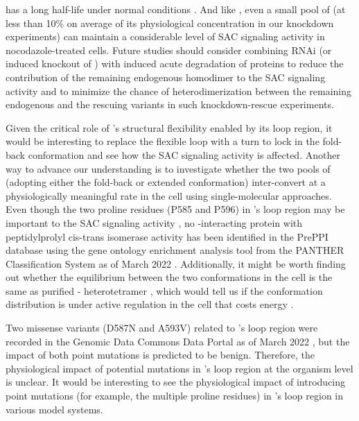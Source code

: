  has a long half-life under normal conditions \cite{MAD1MAD2Half-life}. And like  \cite{Raaijmakers2018, RZZ-MAD1vsBUB1-MAD1_2018, siROD_Zhang2019}, even a small pool of  (at less than 10\% on average of its physiological concentration in our knockdown experiments) can maintain a considerable level of SAC signaling activity in nocodazole-treated cells. Future studies should consider combining RNAi (or induced knockout of ) with induced acute degradation of  proteins to reduce the contribution of the remaining endogenous  homodimer to the SAC signaling activity and to minimize the chance of heterodimerization between the remaining endogenous  and the rescuing  variants in such knockdown-rescue experiments. %

Given the critical role of 's structural flexibility enabled by its loop region, it would be interesting to replace the flexible loop with a turn to lock  in the fold-back conformation and see how the SAC signaling activity is affected. Another way to advance our understanding is to investigate whether the two pools of  (adopting either the fold-back or extended conformation) inter-convert at a physiologically meaningful rate in the cell using single-molecular approaches. Even though the two proline residues (P585 and P596) in ’s loop region may be important to the SAC signaling activity , no -interacting protein with peptidylprolyl cis-trans isomerase activity has been identified in the PrePPI database using the gene ontology enrichment analysis tool from the PANTHER Classification System as of March 2022 \cite{PrePPI, PANTHER}. Additionally, it might be worth finding out whether the equilibrium between the two conformations in the cell is the same as purified - heterotetramer , which would tell us if the conformation distribution is under active regulation in the cell that costs energy \cite{MAD2Dynamics}. %

Two missense variants (D587N and A593V) related to ’s loop region were recorded in the Genomic Data Commons Data Portal as of March 2022 \cite{GDC}, but the impact of both point mutations is predicted to be benign. Therefore, the physiological impact of potential mutations in ’s loop region at the organism level is unclear. It would be interesting to see the physiological impact of introducing point mutations (for example, the multiple proline residues) in ’s loop region in various model systems.

